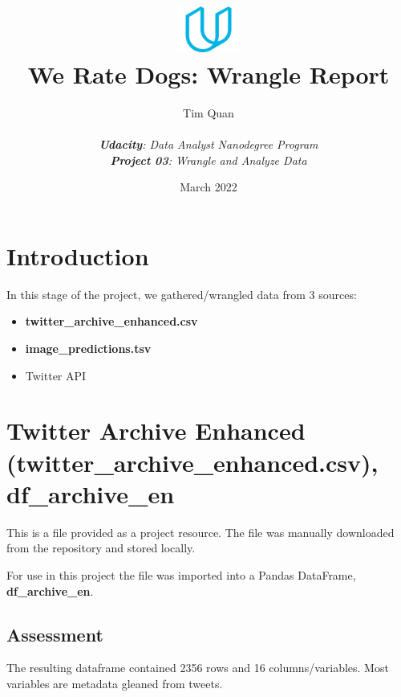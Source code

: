 \documentclass[10pt,a4paper]{report}
\title{\includegraphics[width=2cm]{udacity-logo.png}\\We Rate Dogs: Wrangle Report}
\date{March 2022}
\author{Tim Quan\\ \\ 
	\textit{\textbf{Udacity}: Data Analyst Nanodegree Program}\\ 
	\textit{\textbf{Project 03}: Wrangle and Analyze Data}}
\begin{document}
\maketitle




\section{Introduction}

In this stage of the project, we gathered/wrangled data from 3 sources:
\begin{itemize}
	\item \textbf{twitter\_archive\_enhanced.csv}
	\item \textbf{image\_predictions.tsv}
	\item Twitter API
\end{itemize}

\section{Twitter Archive Enhanced \textbf{(twitter\_archive\_enhanced.csv), }\textbf{df\_archive\_en}}

This is a file provided as a project resource.
The file was manually downloaded from the repository and stored locally.

For use in this project the file was imported into a Pandas DataFrame, \textbf{df\_archive\_en}.

	\subsection{Assessment}
	The resulting dataframe contained 2356 rows and 16 columns/variables. Most variables are metadata gleaned from tweets. 
\end{document}
